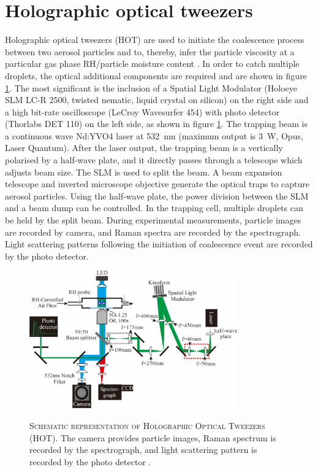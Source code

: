 \section{Holographic optical tweezers}
Holographic optical tweezers (HOT) are used to initiate the coalescence process between two aerosol particles and to, thereby, infer the particle viscosity at a particular gas phase RH/particle moisture content \cite{Song2016a}. In order to catch multiple droplets, the optical additional components are required and are shown in figure \ref{fig:wat_s5}. The most significant is the inclusion of a Spatial Light Modulator (Holoeye SLM LC-R 2500, twisted nematic, liquid crystal on silicon) on the right side and a high bit-rate oscilloscope (LeCroy Wavesurfer 454) with photo detector (Thorlabs DET 110) on the left side, as shown in figure \ref{fig:wat_s5}. The trapping beam is a continuous wave Nd:YVO4 laser at \SI{532}{\nano\meter} (maximum output is \SI{3}{\watt}, Opus, Laser Quantum). After the laser output, the trapping beam is a vertically polarised by a half-wave plate, and it directly passes through a telescope which adjusts beam size. The SLM is used to split the beam. A beam expansion telescope and inverted microscope objective generate the optical traps to capture aerosol particles. Using the half-wave plate, the power division between the SLM and a beam dump can be controlled. In the trapping cell, multiple droplets can be held by the split beam. During experimental measurements, particle images are recorded by camera, and Raman spectra are recorded by the spectrograph. Light scattering patterns following the initiation of coalescence event are recorded by the photo detector.

\begin{figure}
    \centering
    \caption[Schematic representation of holographic optical tweezers (HOT)]{\textsc{Schematic representation of Holographic Optical Tweezers (HOT)}. The camera provides particle images, Raman spectrum is recorded by the spectrograph, and light scattering pattern is recorded by the photo detector \cite{Song2016a}.}
    \includegraphics[width=0.8\textwidth]{chapters/water_hopping/figures/image011.jpg}
    \label{fig:wat_s5}
\end{figure}

